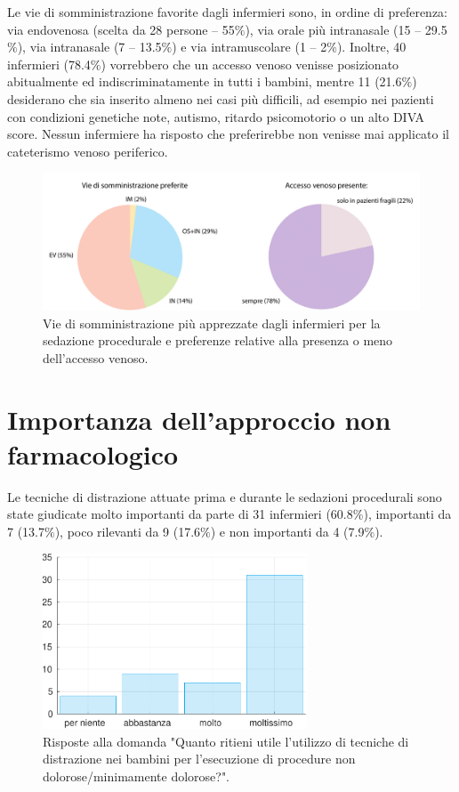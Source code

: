 Le vie di somministrazione favorite dagli infermieri sono, in ordine di preferenza: via endovenosa (scelta da 28 persone -- 55$\%$), via orale più intranasale (15 -- 29.5$\%$), via intranasale (7 -- 13.5$\%$) e via intramuscolare (1 -- 2$\%$). Inoltre, 40 infermieri (78.4$\%$) vorrebbero che un accesso venoso venisse posizionato abitualmente ed indiscriminatamente in tutti i bambini, mentre 11 (21.6$\%$) desiderano che sia inserito almeno nei casi più difficili, ad esempio nei pazienti con condizioni genetiche note, autismo, ritardo psicomotorio o un alto DIVA score. Nessun infermiere ha risposto che preferirebbe non venisse mai applicato il cateterismo venoso periferico. 

\begin{figure}[!h]
    \centering
    \includegraphics[width=1\textwidth]{Figure/sommicrosoftchiaro.pdf}
    \caption{Vie di somministrazione più apprezzate dagli infermieri per la sedazione procedurale e preferenze relative alla presenza o meno dell'accesso venoso.}
    \label{fig:viedisomm}
\end{figure}

\newpage

\section{Importanza dell'approccio non farmacologico}

Le tecniche di distrazione attuate prima e durante le sedazioni procedurali sono state giudicate molto importanti da parte di 31 infermieri (60.8$\%$), importanti da 7 (13.7$\%$), poco rilevanti da 9 (17.6$\%$) e non importanti da 4 (7.9$\%$).

\bigskip

\begin{figure}[!h]
    \centering
    \includegraphics[width=0.7\textwidth]{Figure/distrazione.pdf}
    \caption{Risposte alla domanda "Quanto ritieni utile l’utilizzo di tecniche di distrazione nei bambini per l’esecuzione di procedure non dolorose/minimamente dolorose?".}%
    \label{fig:distrazione}
\end{figure}

